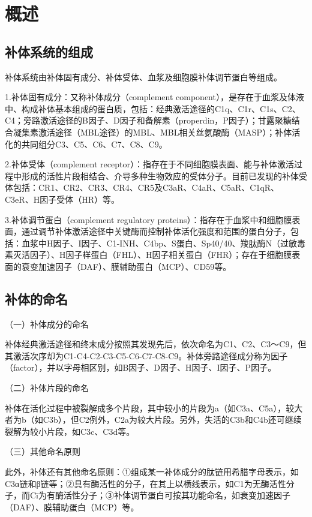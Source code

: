 \section{概述}


\subsection{补体系统的组成}

补体系统由补体固有成分、补体受体、血浆及细胞膜补体调节蛋白等组成。

1.补体固有成分：又称补体成分（complement
component），是存在于血浆及体液中、构成补体基本组成的蛋白质，包括：经典激活途径的C1q、C1r、C1s、C2、C4；旁路激活途径的B因子、D因子和备解素（properdin，P因子）；甘露聚糖结合凝集素激活途径（MBL途径）的MBL、MBL相关丝氨酸酶（MASP）；补体活化的共同组分C3、C5、C6、C7、C8、C9。

2.补体受体（complement
receptor）：指存在于不同细胞膜表面、能与补体激活过程中形成的活性片段相结合、介导多种生物效应的受体分子。目前已发现的补体受体包括：CR1、CR2、CR3、CR4、CR5及C3aR、C4aR、C5aR、C1qR、C3eR、H因子受体（HR）等。

3.补体调节蛋白（complement regulatory
proteins）：指存在于血浆中和细胞膜表面，通过调节补体激活途径中关键酶而控制补体活化强度和范围的蛋白分子，包括：血浆中H因子、I因子、C1-INH、C4bp、S蛋白、Sp40/40、羧肽酶N（过敏毒素灭活因子）、H因子样蛋白（FHL）、H因子相关蛋白（FHR）；存在于细胞膜表面的衰变加速因子（DAF）、膜辅助蛋白（MCP）、CD59等。


\subsection{补体的命名}

（一）补体成分的命名

补体经典激活途径和终末成分按照其发现先后，依次命名为C1、C2、C3～C9，但其激活次序却为C1-C4-C2-C3-C5-C6-C7-C8-C9。补体旁路途径成分称为因子（factor），并以字母相区别，如B因子、D因子、H因子、I因子、P因子。

（二）补体片段的命名

补体在活化过程中被裂解成多个片段，其中较小的片段为a（如C3a、C5a），较大者为b（如C3b），但C2例外，C2a为较大片段。另外，失活的C3b和C4b还可继续裂解为较小片段，如C3c、C3d等。

（三）其他命名原则

此外，补体还有其他命名原则：①组成某一补体成分的肽链用希腊字母表示，如C3α链和β链等；②具有酶活性的分子，在其上以横线表示，如C1为无酶活性分子，而Cī为有酶活性分子；③补体调节蛋白可按其功能命名，如衰变加速因子（DAF）、膜辅助蛋白（MCP）等。


